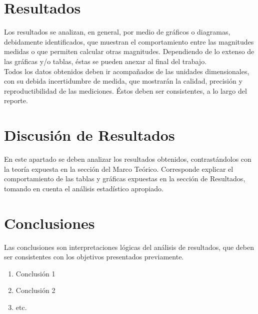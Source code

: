 \documentclass[osajnl,showpacs,superscriptaddress,10pt]{article}
\begin{document}
\begin{multicols}{2}

\section{Resultados}

    Los resultados se analizan, en general, por medio de gráficos o diagramas, debidamente identificados, que muestran el comportamiento entre las magnitudes medidas o que permiten calcular otras magnitudes. Dependiendo de lo extenso de las gráficas y/o tablas, éstas se pueden anexar al final del trabajo.\\
   
    Todos los datos obtenidos deben ir acompañados de las unidades dimensionales, con su debida incertidumbre de medida, que mostrarán la calidad, precisión y reproductibilidad de las mediciones. Éstos deben ser consistentes, a lo largo del reporte.\\


\section{Discusión de Resultados}

    En este apartado se deben analizar los resultados obtenidos, contrastándolos con la teoría expuesta en la sección del Marco Teórico. Corresponde explicar el comportamiento de las tablas y gráficas expuestas en la sección de Resultados, tomando en cuenta el análisis estadístico apropiado.\\

\section{Conclusiones}

    Las conclusiones son interpretaciones lógicas del análisis de resultados, que deben ser consistentes con los objetivos presentados previamente.\\

\begin{enumerate}
    \item Conclusión 1
    \item Conclusión 2
    \item etc.
\end{enumerate}

\end{multicols}
\end{document}
